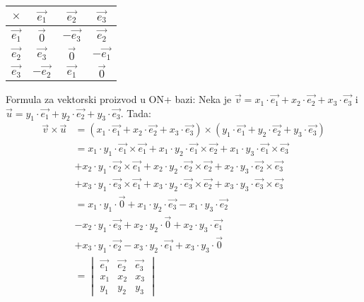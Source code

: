 \documentclass[12pt]{article}
\newcommand{\vek}[1]{\overrightarrow{#1}}
\begin{document}
    \hfill
    \begin{minipage}{0.3\textwidth}
        \centering
        \begin{tabular}{|c|c|c|c|}
            \hline
            $\times$    & $\vek{e_1}$  & $\vek{e_2}$  & $\vek{e_3}$  \\
            \hline
            $\vek{e_1}$ & $\vek{0}$    & $-\vek{e_3}$ & $\vek{e_2}$  \\
            \hline
            $\vek{e_2}$ & $\vek{e_3}$  & $\vek{0}$    & $-\vek{e_1}$ \\
            \hline
            $\vek{e_3}$ & $-\vek{e_2}$ & $\vek{e_1}$  & $\vek{0}$    \\
            \hline
        \end{tabular}
    \end{minipage}
    Formula za vektorski proizvod u ON+ bazi: Neka je $\vek{v}=x_1\cdot\vek{e_1}+x_2\cdot\vek{e_2}+x_3\cdot\vek{e_3}$ i
$\vek{u}=y_1\cdot\vek{e_1}+y_2\cdot\vek{e_2}+y_3\cdot\vek{e_3}$. Tada:
    \begin{align*}
        \vek{v}\times\vek{u} & = (x_1\cdot\vek{e_1}+x_2\cdot\vek{e_2}+x_3\cdot\vek{e_3})\times(y_1\cdot\vek{e_1}+y_2\cdot\vek{e_2}+y_3\cdot\vek{e_3})                \\
                             & = x_1\cdot y_1\cdot \vek{e_1}\times \vek{e_1}+x_1\cdot y_2\cdot \vek{e_1}\times \vek{e_2}+x_1\cdot y_3\cdot \vek{e_1}\times \vek{e_3} \\
                             & + x_2\cdot y_1\cdot \vek{e_2}\times \vek{e_1}+x_2\cdot y_2\cdot \vek{e_2}\times \vek{e_2}+x_2\cdot y_3\cdot \vek{e_2}\times \vek{e_3} \\
                             & + x_3\cdot y_1\cdot \vek{e_3}\times \vek{e_1}+x_3\cdot y_2\cdot \vek{e_3}\times \vek{e_2}+x_3\cdot y_3\cdot \vek{e_3}\times \vek{e_3} \\
                             & = x_1\cdot y_1\cdot \vek{0} + x_1\cdot y_2\cdot \vek{e_3}-x_1\cdot y_3\cdot \vek{e_2}                                                 \\
                             & - x_2\cdot y_1\cdot \vek{e_3}+x_2\cdot y_2\cdot \vek{0}+x_2\cdot y_3\cdot \vek{e_1}                                                   \\
                             & + x_3\cdot y_1\cdot \vek{e_2}-x_3\cdot y_2\cdot \vek{e_1}+x_3\cdot y_3\cdot \vek{0}                                                   \\
                             & = \begin{vmatrix}
                                     \vek{e_1} & \vek{e_2} & \vek{e_3} \\
                                     x_1       & x_2       & x_3       \\
                                     y_1       & y_2       & y_3
                                 \end{vmatrix}
    \end{align*}
\end{document}
